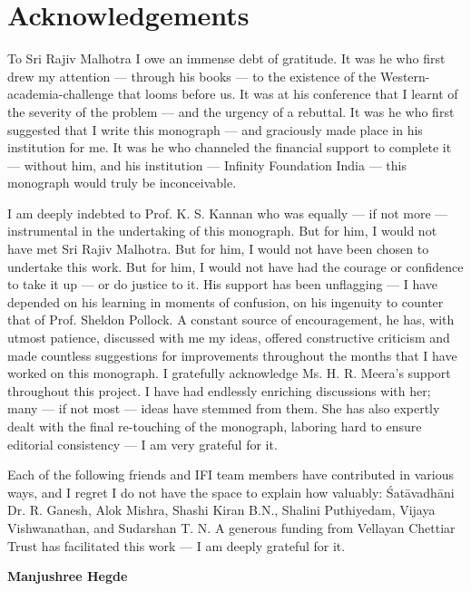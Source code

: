 \makeatletter
\def\@makeschapterhead#1{%
  \vspace*{50\p@}%
  {\parindent \z@ \raggedright
    \normalfont
    \interlinepenalty\@M
    \LARGE \bfseries  #1\par\nobreak
    \vskip 40\p@
  }}
\makeatother

\chapter*{Acknowledgements}\label{ack1}


To Sri Rajiv Malhotra I owe an immense debt of gratitude. It was he who first drew my attention --- through his books --- to the existence of the Western-academia-challenge that looms before us. It was at his conference that I learnt of the severity of the problem --- and the urgency of a rebuttal. It was he who first suggested that I write this monograph --- and graciously made place in his institution for me. It was he who channeled the financial support to complete it --- without him, and his institution --- Infinity Foundation India --- this monograph would truly be inconceivable.   

I am deeply indebted to Prof. K. S. Kannan who was equally --- if not more --- instrumental in the undertaking of this monograph. But for him, I would not have met Sri Rajiv Malhotra. But for him, I would not have been chosen to undertake this work. But for him, I would not have had the courage or confidence to take it up --- or do justice to it. His support has been unflagging --- I have depended on his learning in moments of confusion, on his ingenuity to counter that of Prof. Sheldon Pollock. A constant source of encouragement, he has, with utmost patience, discussed with me my ideas, offered constructive criticism and made countless suggestions for improvements throughout the months that I have worked on this monograph.  I gratefully acknowledge Ms. H. R. Meera’s support throughout this project. I have had endlessly enriching discussions with her; many --- if not most --- ideas have stemmed from them.  She has also expertly dealt with the final re-touching of the monograph, laboring hard to ensure editorial consistency --- I am very grateful for it. 

Each of the following friends and IFI team members have contributed in various ways, and I regret I do not have the space to explain how valuably: Śatāvadhāni Dr. R. Ganesh, Alok Mishra, Shashi Kiran B.N., Shalini Puthiyedam, Vijaya Vishwanathan, and Sudarshan T. N. A generous funding from Vellayan Chettiar Trust has facilitated this work --- I am deeply grateful for it. 


\bigskip
\hfill {\bf Manjushree Hegde}

